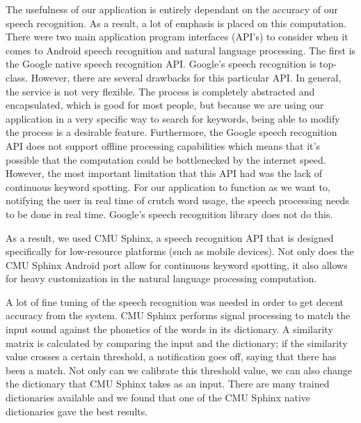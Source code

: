 \documentclass{sigchi}
\begin{document}
The usefulness of our application is entirely dependant on the accuracy of our speech recognition. As a result, a lot of emphasis is placed on this computation. There were two main application program interfaces (API’s) to consider when it comes to Android speech recognition and natural language processing. The first is the Google native speech recognition API. Google’s speech recognition is top-class. However, there are several drawbacks for this particular API. In general, the service is not very flexible. The process is completely abstracted and encapsulated, which is good for most people, but because we are using our application in a very specific way to search for keywords, being able to modify the process is a desirable feature. Furthermore, the Google speech recognition API does not support offline processing capabilities which means that it’s possible that the computation could be bottlenecked by the internet speed. However, the most important limitation that this API had was the lack of continuous keyword spotting. For our application to function as we want to, notifying the user in real time of crutch word usage, the speech processing needs to be done in real time. Google’s speech recognition library does not do this. 

As a result, we used CMU Sphinx, a speech recognition API that is designed specifically for low-resource platforms (such as mobile devices). Not only does the CMU Sphinx Android port allow for continuous keyword spotting, it also allows for heavy customization in the natural language processing computation. 

A lot of fine tuning of the speech recognition was needed in order to get decent accuracy from the system. CMU Sphinx performs signal processing to match the input sound against the phonetics of the words in its dictionary. A similarity matrix is calculated by comparing the input and the dictionary; if the similarity value crosses a certain threshold, a notification goes off, saying that there has been a match. Not only can we calibrate this threshold value, we can also change the dictionary that CMU Sphinx takes as an input. There are many trained dictionaries available and we found that one of the CMU Sphinx native dictionaries gave the best results.
\end{document}
